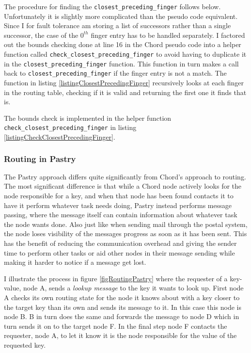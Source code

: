 The procedure for finding the \verb=closest_preceding_finger= follows below. Unfortunately it is slightly more complicated than the pseudo code equivalent. Since I for fault tolerance am storing a list of successors rather than a single successor, the case of the $ 0^{th} $ finger entry has to be handled separately. 
I factored out the bounds checking done at line 16 in the Chord pseudo code into a helper function called \verb=check_closest_preceding_finger= to avoid having to duplicate it in the \verb=closest_preceding_finger= function.
This function in turn makes a call back to \verb=closest_preceding_finger= if the finger entry is not a match.
The function in listing \ref{listingClosestPrecedingFinger} recursively looks at each finger in the routing table, checking if it is valid and returning the first one it finds that is.



The bounds check is implemented in the helper function \verb=check_closest_preceding_finger= in listing \ref{listingCheckClosestPrecedingFinger}.



\subsubsection{Routing in Pastry}
The Pastry approach differs quite significantly from Chord's approach to routing.
The most significant difference is that while a Chord node actively looks for the node responsible for a key, and when that node has been found contacts it to have it perform whatever task needs doing, Pastry instead performs message passing, where the message itself can contain information about whatever task the node wants done.
Also just like when sending mail through the postal system, the node loses visibility of the messages progress as soon as it has been sent. This has the benefit of reducing the communication overhead and giving the sender time to perform other tasks or aid other nodes in their message sending while making it harder to notice if a message get lost.

I illustrate the process in figure \ref{figRoutingPastry} where the requester of a key-value, node A, sends a \emph{lookup message} to the key it wants to look up. First node A checks its own routing state for the node it knows about with a key closer to the target key than its own and sends its message to it. In this case this node is node B. B in turn does the same and forwards the message to node D which in turn sends it on to the target node F. In the final step node F contacts the requester, node A, to let it know it is the node responsible for the value of the requested key. 

